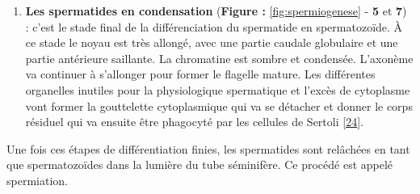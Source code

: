 \documentclass[12pt,a4paper,twoside]{ugathesis}
\providecommand{\tightlist}{%
  \setlength{\itemsep}{0pt}\setlength{\parskip}{0pt}}
\theoremstyle{definition}
\theoremstyle{definition}
\theoremstyle{definition}
\theoremstyle{remark}
\begin{document}
\begin{enumerate}
\def\labelenumi{\arabic{enumi}.}
\setcounter{enumi}{2}
\tightlist
\item
  \textbf{Les spermatides en condensation} (\textbf{Figure :
  }\ref{fig:spermiogenese} - \textbf{5} et \textbf{7}) : c'est le stade
  final de la différenciation du spermatide en spermatozoïde. À ce stade
  le noyau est très allongé, avec une partie caudale globulaire et une
  partie antérieure saillante. La chromatine est sombre et condensée.
  L'axonème va continuer à s'allonger pour former le flagelle mature.
  Les différentes organelles inutiles pour la physiologique spermatique
  et l'excès de cytoplasme vont former la gouttelette cytoplasmique qui
  va se détacher et donner le corps résiduel qui va ensuite être
  phagocyté par les cellules de Sertoli
  {[}\protect\hyperlink{ref-Hermo2010}{24}{]}.
\end{enumerate}

Une fois ces étapes de différentiation finies, les spermatides sont
relâchées en tant que spermatozoïdes dans la lumière du tube séminifère.
Ce procédé est appelé spermiation.
\end{document}
